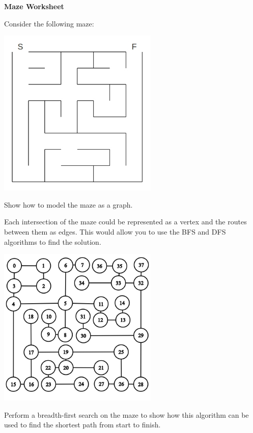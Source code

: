 \documentclass[12pt]{article}
\begin{document}
\newcommand{\lsp}[1]{\large\renewcommand{\baselinestretch}{#1}\normalsize}

\lsp{1}
\pagestyle{plain}
\begin{center}
{\bf
Maze Worksheet
}
\end{center}

\begin{flushleft}
   Consider the following maze:
\end{flushleft}

\begin{center}
   \includegraphics[width=3in]{./maze.jpg}
\end{center}
\begin{flushleft}
   Show how to model the maze as a graph.

   Each intersection of the maze could be represented as a vertex and the
   routes between them as edges. This would allow you to use the BFS and DFS
   algorithms to find the solution.
\end{flushleft}
\begin{center}
   \includegraphics[width=3in]{./graph.png}
\end{center}

\pagebreak
\begin{flushleft}
   Perform a breadth-first search on the maze to show how this algorithm can be used to find the shortest path from start to finish.
\end{flushleft}
\end{document}
